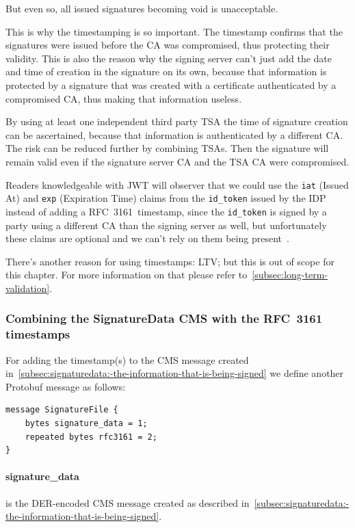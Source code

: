 But even so, all issued signatures becoming void is unacceptable.

This is why the timestamping is so important.
The timestamp confirms that the signatures were issued before the \gls{CA} was compromised,
thus protecting their validity.
This is also the reason why the signing server can't just add the date and time of creation in the signature on its own,
because that information is protected by a signature that was created with a certificate authenticated
by a compromised \gls{CA}, thus making that information useless.

By using at least one independent third party \gls{TSA} the time of signature creation can be ascertained,
because that information is authenticated by a different \gls{CA}.
The risk can be reduced further by combining \gls{TSA}s.
Then the signature will remain valid even if the signature server \gls{CA} and the \gls{TSA} \gls{CA} were compromised.

Readers knowledgeable with \gls{JWT} will observer that we could use the \texttt{iat} (Issued At) and \texttt{exp} (Expiration Time)
claims from the \texttt{id\_token} issued by the \gls{IDP} instead of adding a RFC~3161~timestamp,
since the \texttt{id\_token} is signed by a party using a different \gls{CA} than the signing server as well,
but unfortunately these claims are optional and we can't rely on them being present~\cite[Sections 4.1.4 and 4.1.6]{rfc7519}.

There's another reason for using timestamps: \glsdesc{LTV}; but this is out of scope for this chapter.
For more information on that please refer to~\ref{subsec:long-term-validation}.

\subsubsection{Combining the SignatureData CMS with the RFC~3161 timestamps}
For adding the timestamp(s) to the \gls{CMS} message created in~\ref{subsec:signaturedata:-the-information-that-is-being-signed}
we define another Protobuf message as follows:

\begin{lstlisting}[caption={SignatureFile message}, captionpos=b, label={lst:signaturefileschema}]
message SignatureFile {
    bytes signature_data = 1;
    repeated bytes rfc3161 = 2;
}
\end{lstlisting}

\paragraph{signature\_data} is the \gls{DER}-encoded \gls{CMS} message created as described in~\ref{subsec:signaturedata:-the-information-that-is-being-signed}.
